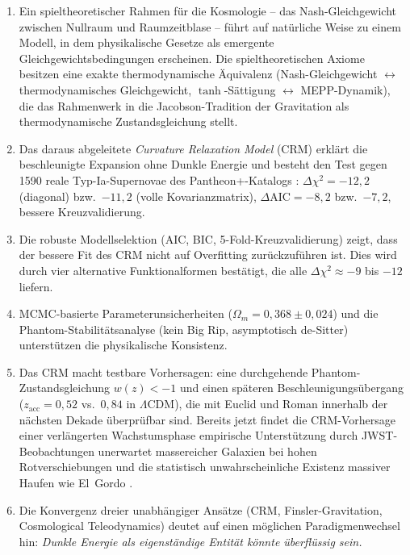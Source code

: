 \documentclass[aps,prd,twocolumn,superscriptaddress,nofootinbib]{revtex4-2}
\begin{document}
\begin{enumerate}
\item Ein spieltheoretischer Rahmen f\"ur die Kosmologie -- das Nash-Gleichgewicht zwischen Nullraum und Raumzeitblase -- f\"uhrt auf nat\"urliche Weise zu einem Modell, in dem physikalische Gesetze als emergente Gleichgewichtsbedingungen erscheinen. Die spieltheoretischen Axiome besitzen eine exakte thermodynamische \"Aquivalenz (Nash-Gleichgewicht $\leftrightarrow$ thermodynamisches Gleichgewicht, $\tanh$-S\"attigung $\leftrightarrow$ MEPP-Dynamik), die das Rahmenwerk in die Jacobson-Tradition der Gravitation als thermodynamische Zustandsgleichung \cite{Jacobson1995} stellt.
\item Das daraus abgeleitete \textit{Curvature Relaxation Model} (CRM) erkl\"art die beschleunigte Expansion ohne Dunkle Energie und besteht den Test gegen 1590 reale Typ-Ia-Supernovae des Pantheon+-Katalogs \cite{Scolnic2022}: $\Delta\chi^2 = -12{,}2$ (diagonal) bzw.\ $-11{,}2$ (volle Kovarianzmatrix), $\Delta\mathrm{AIC} = -8{,}2$ bzw.\ $-7{,}2$, bessere Kreuzvalidierung.
\item Die robuste Modellselektion (AIC, BIC, 5-Fold-Kreuzvalidierung) zeigt, dass der bessere Fit des CRM nicht auf Overfitting zur\"uckzuf\"uhren ist. Dies wird durch vier alternative Funktionalformen best\"atigt, die alle $\Delta\chi^2 \approx -9$ bis $-12$ liefern.
\item MCMC-basierte Parameterunsicherheiten ($\Omega_m = 0{,}368 \pm 0{,}024$) und die Phantom-Stabilit\"atsanalyse (kein Big Rip, asymptotisch de-Sitter) unterst\"utzen die physikalische Konsistenz.
\item Das CRM macht testbare Vorhersagen: eine durchgehende Phantom-Zustandsgleichung $w(z) < -1$ und einen sp\"ateren Beschleunigungs\"ubergang ($z_{\mathrm{acc}} = 0{,}52$ vs.\ $0{,}84$ in $\Lambda$CDM), die mit Euclid und Roman innerhalb der n\"achsten Dekade \"uberpr\"ufbar sind. Bereits jetzt findet die CRM-Vorhersage einer verl\"angerten Wachstumsphase empirische Unterst\"utzung durch JWST-Beobachtungen unerwartet massereicher Galaxien bei hohen Rotverschiebungen \cite{Labbe2023, BoylanKolchin2023} und die statistisch un\-wahrscheinliche Existenz massiver Haufen wie El~Gordo \cite{Asencio2023}.
\item Die Konvergenz dreier unabh\"angiger Ans\"atze (CRM, Finsler-Gravitation, Cosmological Teleodynamics) deutet auf einen m\"oglichen Paradigmenwechsel hin: \textit{Dunkle Energie als eigenst\"andige Entit\"at k\"onnte \"uberfl\"ussig sein.}
\end{enumerate}
\end{document}
